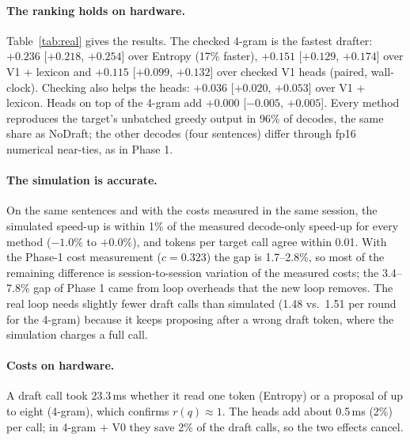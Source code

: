 \paragraph{The ranking holds on hardware.} Table~\ref{tab:real} gives the results. The checked 4-gram is
the fastest drafter: $+0.236$ [$+0.218$, $+0.254$] over Entropy (17\% faster), $+0.151$ [$+0.129$,
$+0.174$] over V1 + lexicon and $+0.115$ [$+0.099$, $+0.132$] over checked V1 heads (paired, wall-clock).
Checking also helps the heads: $+0.036$ [$+0.020$, $+0.053$] over V1 + lexicon. Heads on top of the
4-gram add $+0.000$ [$-0.005$, $+0.005$]. Every method reproduces the target's unbatched greedy output
in 96\% of decodes, the same share as NoDraft; the other decodes (four sentences) differ through fp16
numerical near-ties, as in Phase 1.

\paragraph{The simulation is accurate.} On the same sentences and with the costs measured in the same
session, the simulated speed-up is within 1\% of the measured decode-only speed-up for every method
($-1.0\%$ to $+0.0\%$), and tokens per target call agree within 0.01. With the Phase-1 cost measurement
($c=0.323$) the gap is 1.7--2.8\%, so most of the remaining difference is session-to-session variation
of the measured costs; the 3.4--7.8\% gap of Phase 1 came from loop overheads that the new loop removes.
The real loop needs slightly fewer draft calls than simulated (1.48 vs.\ 1.51 per round for the 4-gram)
because it keeps proposing after a wrong draft token, where the simulation charges a full call.

\paragraph{Costs on hardware.} A draft call took 23.3\,ms whether it read one token (Entropy) or a
proposal of up to eight (4-gram), which confirms $r(q)\approx1$. The heads add about 0.5\,ms (2\%) per
call; in 4-gram + V0 they save 2\% of the draft calls, so the two effects cancel.

